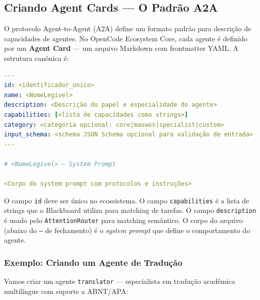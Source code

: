 \subsection{Criando Agent Cards — O Padrão A2A}
\label{sec:agent-cards}

O protocolo Agent-to-Agent (A2A) \citep{google2025a2a} define um formato padrão para descrição de capacidades de agentes. No OpenCode Ecosystem Core, cada agente é definido por um \textbf{Agent Card} — um arquivo Markdown com frontmatter YAML. A estrutura canônica é:

\begin{lstlisting}[language=yaml,caption={Estrutura canônica de um Agent Card A2A},label={lst:agent-card-canonical}]
---
id: <identificador_unico>
name: <NomeLegivel>
description: <Descrição do papel e especialidade do agente>
capabilities: [<lista de capacidades como strings>]
category: <categoria opcional: core|maswos|specialist|custom>
input_schema: <schema JSON Schema opcional para validação de entrada>
---

# <NomeLegivel> — System Prompt

<Corpo do system prompt com protocolos e instruções>
\end{lstlisting}

O campo \texttt{id} deve ser único no ecossistema. O campo \texttt{capabilities} é a lista de strings que o Blackboard utiliza para matching de tarefas. O campo \texttt{description} é usado pelo \texttt{AttentionRouter} para matching semântico. O corpo do arquivo (abaixo do \texttt{---} de fechamento) é o \textit{system prompt} que define o comportamento do agente.

\subsubsection{Exemplo: Criando um Agente de Tradução}

Vamos criar um agente \texttt{translator} — especialista em tradução acadêmica multilíngue com suporte a ABNT/APA:

